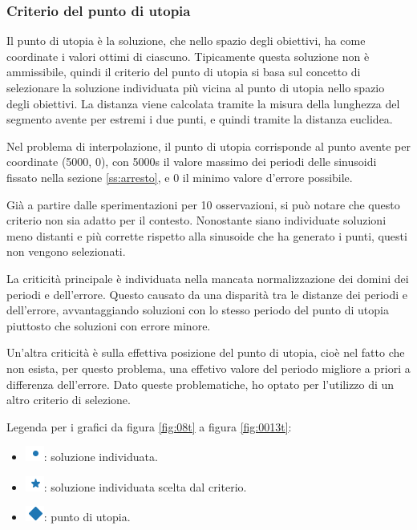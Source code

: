 \documentclass[a4paper,12pt]{report}
\begin{document}
\subsubsection{Criterio del punto di utopia}
\label{ss:utopia}
Il punto di utopia è la soluzione, che nello spazio degli obiettivi, ha come coordinate i valori ottimi di ciascuno. Tipicamente questa soluzione non è ammissibile, quindi il criterio del punto di utopia si basa sul concetto di selezionare la soluzione individuata più vicina al punto di utopia nello spazio degli obiettivi. La distanza viene calcolata tramite la misura della lunghezza del segmento avente per estremi i due punti, e quindi tramite la distanza euclidea.

Nel problema di interpolazione, il punto di utopia corrisponde al punto avente per coordinate (5000, 0), con 5000s il valore massimo dei periodi delle sinusoidi fissato nella sezione \ref{ss:arresto}, e 0 il minimo valore d'errore possibile.

Già a partire dalle sperimentazioni per 10 osservazioni, si può notare che questo criterio non sia adatto per il contesto.
Nonostante siano individuate soluzioni meno distanti e più corrette rispetto alla sinusoide che ha generato i punti, questi non vengono selezionati.

La criticità principale è individuata nella mancata normalizzazione dei domini dei periodi e dell'errore. Questo causato da una disparità tra le distanze dei periodi e dell'errore, avvantaggiando soluzioni con lo stesso periodo del punto di utopia piuttosto che soluzioni con errore minore.

Un'altra criticità è sulla effettiva posizione del punto di utopia, cioè nel fatto che non esista, per questo problema, una effetivo valore del periodo migliore a priori a differenza dell'errore.
Dato queste problematiche, ho optato per l'utilizzo di un altro criterio di selezione.


Legenda per i grafici da figura \ref{fig:08t} a figura \ref{fig:0013t}:
\begin{itemize}
  \item \includegraphics{img/utility/markers/point.png}: soluzione individuata.
  \item \includegraphics{img/utility/markers/star.png}: soluzione individuata scelta dal criterio.
  \item \includegraphics{img/utility/markers/diamond.png}:
  punto di utopia.
\end{itemize}
\end{document}
